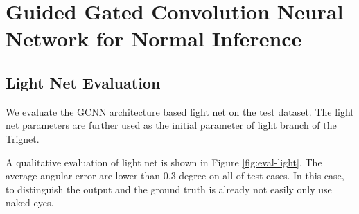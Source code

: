 \documentclass[border=15pt, multi, tikz]{article}
\begin{document}
	
	
	
\section{Guided Gated Convolution Neural Network for Normal Inference }

\subsection{Light Net Evaluation}

We evaluate the GCNN architecture based light net on the test dataset. The light net parameters are further used as the initial parameter of light branch of the Trignet.

A qualitative evaluation of light net is shown in Figure \ref{fig:eval-light}. The average angular error are lower than $ 0.3 $ degree on all of test cases. In this case, to distinguish the output and the ground truth is already not easily only use naked eyes. 
\end{document}
